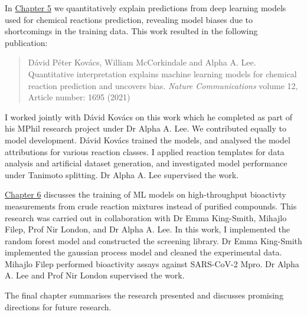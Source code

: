 In \hyperref[ch:transformer]{Chapter 5} we quantitatively explain predictions from deep learning models used for chemical reactions prediction, revealing model biases due to shortcomings in the training data. This work resulted in the following publication:
\begin{quote}
Dávid Péter Kovács, William McCorkindale and Alpha A. Lee. Quantitative interpretation explains machine learning models for chemical reaction prediction and uncovers bias. \textit{Nature Communications} volume 12, Article number: 1695 (2021)
\end{quote}
I worked jointly with Dávid Kovács on this work which he completed as part of his MPhil research project under Dr Alpha A. Lee. We contributed equally to model development. Dávid Kovács trained the models, and analysed the model attributions for various reaction classes. I applied reaction templates for data analysis and artificial dataset generation, and investigated model performance under Tanimoto splitting. Dr Alpha A. Lee supervised the work.

\hyperref[ch:testing]{Chapter 6} discusses the training of ML models on high-throughput bioactivty measurements from crude reaction mixtures instead of purified compounds. This research was carried out in collaboration with Dr Emma King-Smith, Mihajlo Filep, Prof Nir London, and Dr Alpha A. Lee. In this work, I implemented the random forest model and constructed the screening library. Dr Emma King-Smith implemented the gaussian process model and cleaned the experimental data. Mihajlo Filep performed bioactivity assays against SARS-CoV-2 Mpro. Dr Alpha A. Lee and Prof Nir London supervised the work.

The final chapter summarises the research presented and discusses promising directions for future research.